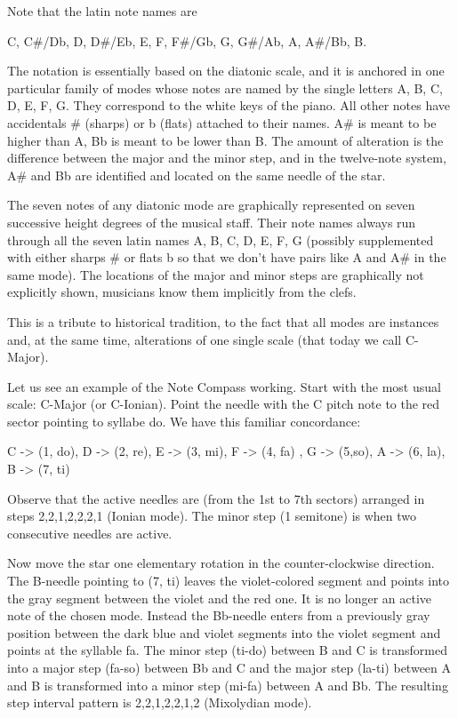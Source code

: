 Note that the latin note names are

C, C\#/Db, D, D\#/Eb, E, F, F\#/Gb, G, G\#/Ab, A, A\#/Bb, B.

The notation is essentially based on the diatonic scale, and it is anchored in one particular family of modes whose notes are named  by the single letters  A, B, C, D, E, F, G. They correspond to the white keys of the piano. All other  notes have accidentals \# (sharps) or b (flats) attached to their  names. A\# is meant to be higher than A,  Bb is meant to be lower than B. The amount of alteration is the difference between the major and the minor step, and in the twelve-note system, A\# and Bb are identified and located on the same needle of the star.

The seven notes of any diatonic mode are graphically represented on seven successive height degrees of the musical staff. Their note names always run through all the seven latin names A, B, C, D, E, F, G (possibly supplemented with either sharps \# or flats b so that we don't have pairs like A and A\# in the same mode). The locations of the major and minor steps are graphically not explicitly shown, musicians know them implicitly from the clefs.

This is a tribute to historical tradition, to the fact that all modes are instances and, at the same time, alterations of one single scale (that today we call C-Major).

Let us see an example of the Note Compass working. Start with the most usual scale: C-Major (or C-Ionian). Point the needle with the C pitch note to the red sector pointing to syllabe do. We have this familiar concordance:

C -> (1, do), D -> (2, re), E -> (3, mi), F -> (4, fa) , G -> (5,so), A -> (6, la), B -> (7, ti)

Observe that the active needles are (from the 1st to 7th sectors) arranged in steps  2,2,1,2,2,2,1 (Ionian mode). The minor step (1 semitone) is when two consecutive needles are active.

Now move the star one elementary rotation in the counter-clockwise direction. The B-needle pointing to (7, ti) leaves the violet-colored segment and points into the gray segment between the violet and the red one. It is no longer an active note of the chosen mode. Instead the Bb-needle enters from a previously gray position between the dark blue and violet segments into the violet segment and points at the syllable fa. The minor step (ti-do) between B and C is transformed into a major step (fa-so) between Bb and C and the major step (la-ti) between A and B is transformed into a minor step (mi-fa) between A and Bb. The resulting step interval pattern is 2,2,1,2,2,1,2 (Mixolydian mode).

